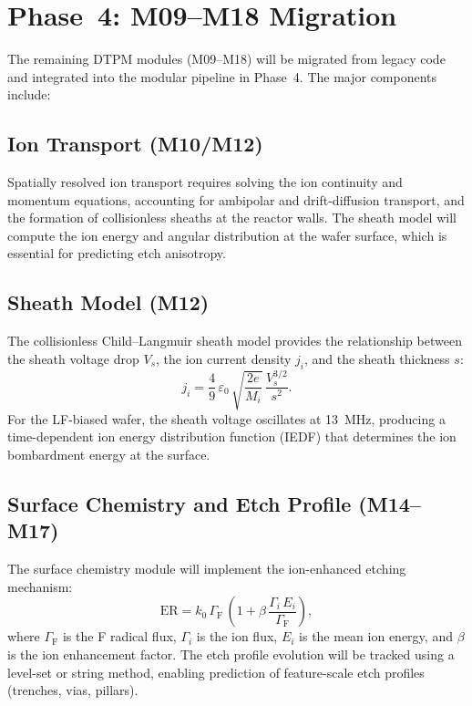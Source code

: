 \documentclass[11pt,a4paper]{report}
\begin{document}
\section{Phase~4: M09--M18 Migration}
\label{sec:phase4}

The remaining DTPM modules (M09--M18) will be migrated from legacy code and integrated into the modular pipeline in Phase~4.  The major components include:

\subsection{Ion Transport (M10/M12)}

Spatially resolved ion transport requires solving the ion continuity and momentum equations, accounting for ambipolar and drift-diffusion transport, and the formation of collisionless sheaths at the reactor walls.  The sheath model will compute the ion energy and angular distribution at the wafer surface, which is essential for predicting etch anisotropy.

\subsection{Sheath Model (M12)}

The collisionless Child--Langmuir sheath model provides the relationship between the sheath voltage drop $V_s$, the ion current density $j_i$, and the sheath thickness $s$:
\begin{equation}
  j_i = \frac{4}{9}\,\varepsilon_0\,\sqrt{\frac{2e}{M_i}}\,\frac{V_s^{3/2}}{s^2}.
\end{equation}
For the LF-biased wafer, the sheath voltage oscillates at \SI{13}{\mega\hertz}, producing a time-dependent ion energy distribution function (IEDF) that determines the ion bombardment energy at the surface.

\subsection{Surface Chemistry and Etch Profile (M14--M17)}

The surface chemistry module will implement the ion-enhanced etching mechanism:
\begin{equation}
  \mathrm{ER} = k_0\,\Gamma_\mathrm{F}\,\left(1 + \beta\,\frac{\Gamma_i\,E_i}{\Gamma_\mathrm{F}}\right),
\end{equation}
where $\Gamma_\mathrm{F}$ is the F radical flux, $\Gamma_i$ is the ion flux, $E_i$ is the mean ion energy, and $\beta$ is the ion enhancement factor.  The etch profile evolution will be tracked using a level-set or string method, enabling prediction of feature-scale etch profiles (trenches, vias, pillars).
\end{document}
